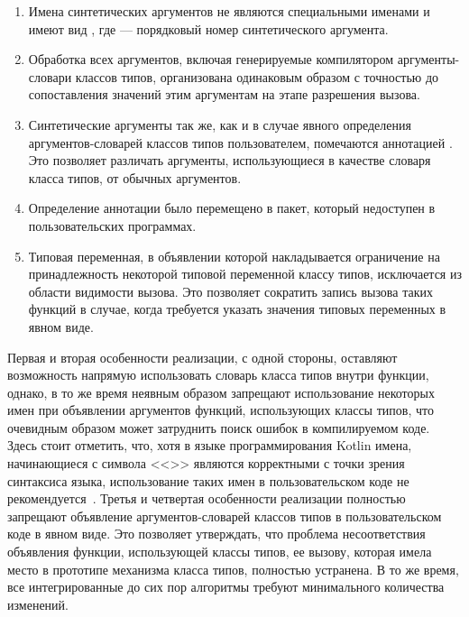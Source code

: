 \begin{enumerate}
    \item Имена синтетических аргументов не являются специальными именами и имеют вид , где  --- порядковый номер синтетического аргумента.
    \item Обработка всех аргументов, включая генерируемые компилятором аргументы-словари классов типов, организована одинаковым образом с точностью до сопоставления значений этим аргументам на этапе разрешения вызова.
    \item Синтетические аргументы так же, как и в случае явного определения аргументов-словарей классов типов пользователем, помечаются аннотацией . Это позволяет различать аргументы, использующиеся в качестве словаря класса типов, от обычных аргументов. 
    \item Определение аннотации  было перемещено в пакет, который недоступен в пользовательских программах. 
    \item Типовая переменная, в объявлении которой накладывается ограничение на принадлежность некоторой типовой переменной классу типов, исключается из области видимости вызова. Это позволяет сократить запись вызова таких функций в случае, когда требуется указать значения типовых переменных в явном виде.
\end{enumerate}
Первая и вторая особенности реализации, с одной стороны, оставляют возможность напрямую использовать словарь класса типов внутри функции, однако, в то же время неявным образом запрещают использование некоторых имен при объявлении аргументов функций, использующих классы типов, что очевидным образом может затруднить поиск ошибок в компилируемом коде. Здесь стоит отметить, что, хотя в языке программирования Kotlin имена, начинающиеся с символа <<\code{\_}>> являются корректными с точки зрения синтаксиса языка, использование таких имен в пользовательском коде не рекомендуется~\cite{kotlin-coding-conventions}. Третья и четвертая особенности реализации полностью запрещают объявление аргументов-словарей классов типов в пользовательском коде в явном виде. Это позволяет утверждать, что проблема несоответствия объявления функции, использующей классы типов, ее вызову, которая имела место в прототипе механизма класса типов, полностью устранена. В то же время, все интегрированные до сих пор алгоритмы требуют минимального количества изменений.    

